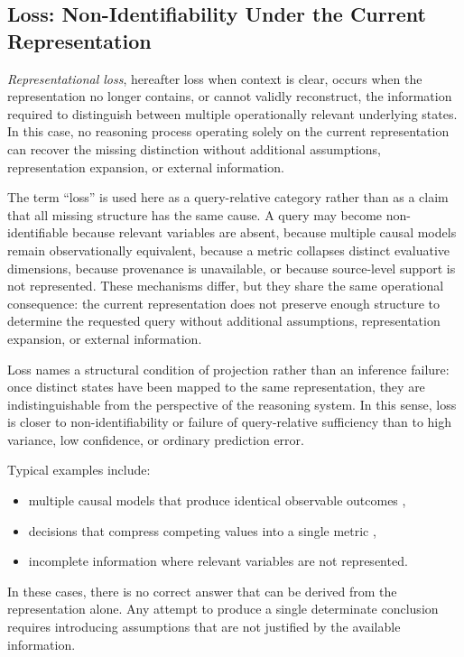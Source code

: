 \documentclass[11pt]{article}
\begin{document}
\subsection{Loss: Non-Identifiability Under the Current Representation}

\emph{Representational loss}, hereafter loss when context is clear, occurs when the representation no longer contains, or cannot validly reconstruct, the information required to distinguish between multiple operationally relevant underlying states. In this case, no reasoning process operating solely on the current representation can recover the missing distinction without additional assumptions, representation expansion, or external information.

The term ``loss'' is used here as a query-relative category rather than as a claim that all missing structure has the same cause. A query may become non-identifiable because relevant variables are absent, because multiple causal models remain observationally equivalent, because a metric collapses distinct evaluative dimensions, because provenance is unavailable, or because source-level support is not represented. These mechanisms differ, but they share the same operational consequence: the current representation does not preserve enough structure to determine the requested query without additional assumptions, representation expansion, or external information.

Loss names a structural condition of projection rather than an inference failure: once distinct states have been mapped to the same representation, they are indistinguishable from the perspective of the reasoning system. In this sense, loss is closer to non-identifiability or failure of query-relative sufficiency than to high variance, low confidence, or ordinary prediction error.

Typical examples include:
\begin{itemize}[leftmargin=1.5em]
    \item multiple causal models that produce identical observable outcomes \cite{Pearl2009},
    \item decisions that compress competing values into a single metric \cite{Savage1954},
    \item incomplete information where relevant variables are not represented.
\end{itemize}

In these cases, there is no correct answer that can be derived from the representation alone. Any attempt to produce a single determinate conclusion requires introducing assumptions that are not justified by the available information.
\end{document}
